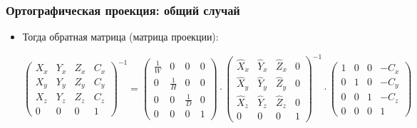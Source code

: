 \documentclass{beamer}
\begin{document}
\begin{frame}[fragile]
\frametitle{Ортографическая проекция: общий случай}
\begin{itemize}
\item Тогда обратная матрица (матрица проекции):
\begin{center}
\begin{math}
\begin{pmatrix}
X_x & Y_x & Z_x & C_x \\
X_y & Y_y & Z_y & C_y \\
X_z & Y_z & Z_z & C_z \\
0 & 0 & 0 & 1
\end{pmatrix}^{-1}
=
\begin{pmatrix}
\frac{1}{W} & 0 & 0 & 0 \\
0 & \frac{1}{H} & 0 & 0 \\
0 & 0 & \frac{1}{D} & 0 \\
0 & 0 & 0 & 1
\end{pmatrix}
\cdot
\begin{pmatrix}
\hat X_x & \hat Y_x & \hat Z_x & 0 \\
\hat X_y & \hat Y_y & \hat Z_y & 0 \\
\hat X_z & \hat Y_z & \hat Z_z & 0 \\
0 & 0 & 0 & 1
\end{pmatrix}^{-1}
\cdot
\begin{pmatrix}
1 & 0 & 0 & -C_x \\
0 & 1 & 0 & -C_y \\
0 & 0 & 1 & -C_z \\
0 & 0 & 0 & 1
\end{pmatrix}
\end{math}
\end{center}
\end{itemize}
\end{frame}
\end{document}
